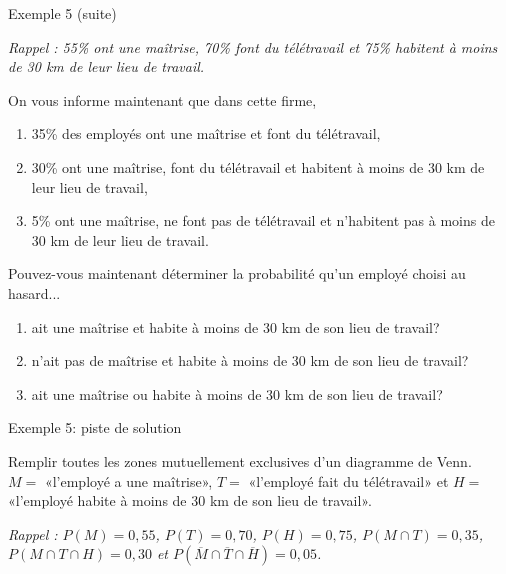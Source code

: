 \documentclass{BeamerTemplate}
\begin{document}
\begin{frame}[t]{Exemple 5 (suite)}

{\footnotesize
 \textit{Rappel : 55\% ont une maîtrise, 70\% font du télétravail et 75\% habitent à moins de 30 km de leur lieu de travail.}

 \medskip

 On vous informe maintenant que dans cette firme,
 \begin{enumerate}[$\bullet$]
 \item 35\%  des employés ont une maîtrise et font du télétravail,
 \item 30\% ont une maîtrise, font du télétravail et habitent à moins de 30 km de leur lieu de travail,
 \item 5\% ont une maîtrise, ne font pas de télétravail et n'habitent pas à moins de 30 km de leur lieu de travail.
 \end{enumerate}
 Pouvez-vous maintenant déterminer la probabilité qu'un employé choisi au hasard...
     \begin{enumerate}\itemsep 5mm
      \item[(ii)] ait une maîtrise et habite à moins de 30 km de son lieu de travail?%
      \item[(iii)] n'ait pas de maîtrise et habite à moins de 30 km de son lieu de travail? %
      \item[(iv)] ait une maîtrise ou habite à moins de 30 km de son lieu de travail?%
     \end{enumerate}
}
\end{frame}

\begin{frame}[t]{Exemple 5: piste de solution}

{\small
 Remplir toutes les zones mutuellement exclusives d'un diagramme de Venn.\\
 $M=$ «l'employé a une maîtrise», $T=$ «l'employé fait du télétravail» et $H=$ «l'employé habite à moins de 30 km de son lieu de travail». %

\textit{Rappel : $P(M)=0,55$, $P(T)=0,70$, $P(H)=0,75$, $P(M\cap T)=0,35$, $P(M\cap T\cap H)=0,30$ et $P(\overline M\cap \overline T\cap \overline H)=0,05$.}
}

\begin{center}
\end{center}

\end{frame}
\end{document}

